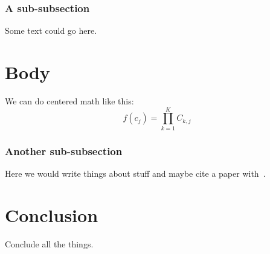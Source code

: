 \documentclass[conference]{IEEEtran}
\begin{document}
    \subsubsection{A sub-subsection}
    Some text could go here.
    \section{Body}
    We can do centered math like this:
    \[f(c_{j}) = \prod_{k = 1}^{K}C_{k, j}\] 
    \subsubsection{Another sub-subsection}
    Here we would write things about stuff and maybe cite a paper with~\cite{Amdahl:1967:VSP:1465482.1465560}.
    \section{Conclusion}
    Conclude all the things.
    \printbibliography
\end{document}
